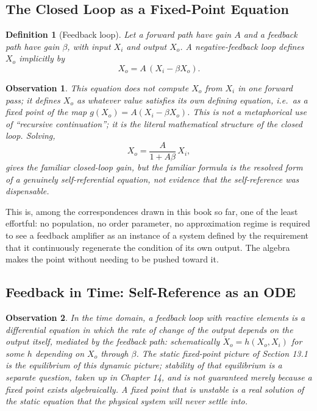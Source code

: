 \documentclass[12pt]{article}
\newtheorem{definition}{Definition}
\newtheorem{observation}{Observation}
\begin{document}
\subsection{The Closed Loop as a Fixed-Point Equation}

\begin{definition}[Feedback loop]
Let a forward path have gain $A$ and a feedback path have gain $\beta$, with input $X_i$ and output $X_o$. A negative-feedback loop defines $X_o$ implicitly by
\[
X_o = A\,(X_i - \beta X_o).
\]
\end{definition}

\begin{observation}
This equation does not compute $X_o$ from $X_i$ in one forward pass; it defines $X_o$ as whatever value satisfies its own defining equation, i.e.\ as a fixed point of the map $g(X_o) = A(X_i - \beta X_o)$. This is not a metaphorical use of ``recursive continuation''; it is the literal mathematical structure of the closed loop. Solving,
\[
X_o = \frac{A}{1+A\beta}\,X_i,
\]
gives the familiar closed-loop gain, but the familiar formula is the resolved form of a genuinely self-referential equation, not evidence that the self-reference was dispensable.
\end{observation}

This is, among the correspondences drawn in this book so far, one of the least effortful: no population, no order parameter, no approximation regime is required to see a feedback amplifier as an instance of a system defined by the requirement that it continuously regenerate the condition of its own output. The algebra makes the point without needing to be pushed toward it.

\subsection{Feedback in Time: Self-Reference as an ODE}

\begin{observation}
In the time domain, a feedback loop with reactive elements is a differential equation in which the rate of change of the output depends on the output itself, mediated by the feedback path: schematically $\dot X_o = h(X_o, X_i)$ for some $h$ depending on $X_o$ through $\beta$. The static fixed-point picture of Section 13.1 is the equilibrium of this dynamic picture; stability of that equilibrium is a separate question, taken up in Chapter 14, and is not guaranteed merely because a fixed point exists algebraically. A fixed point that is unstable is a real solution of the static equation that the physical system will never settle into.
\end{observation}
\end{document}
